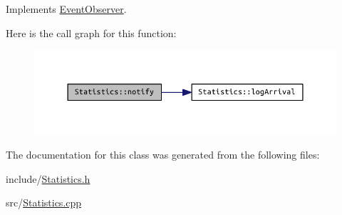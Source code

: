 Implements \hyperlink{class_event_observer_a81b3c545084ba3c8eaa8c83f5a0a4eb8}{Event\+Observer}.



Here is the call graph for this function\+:
\nopagebreak
\begin{figure}[H]
\begin{center}
\leavevmode
\includegraphics[width=350pt]{class_statistics_a75d0a1191341fe95e94bf50a6b69a5a3_cgraph}
\end{center}
\end{figure}




The documentation for this class was generated from the following files\+:\begin{DoxyCompactItemize}
\item 
include/\hyperlink{_statistics_8h}{Statistics.\+h}\item 
src/\hyperlink{_statistics_8cpp}{Statistics.\+cpp}\end{DoxyCompactItemize}
